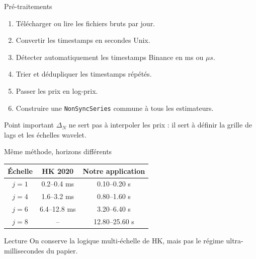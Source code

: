 \documentclass[10pt,aspectratio=169]{beamer}
\begin{document}
\begin{frame}{Pré-traitements}
  \begin{enumerate}
    \item Télécharger ou lire les fichiers bruts par jour.
    \item Convertir les timestamps en secondes Unix.
    \item Détecter automatiquement les timestamps Binance en ms ou \(\mu s\).
    \item Trier et dédupliquer les timestamps répétés.
    \item Passer les prix en log-prix.
    \item Construire une \texttt{NonSyncSeries} commune à tous les estimateurs.
  \end{enumerate}

  \vspace{0.35cm}
  \begin{exampleblock}{Point important}
    \(\Delta_N\) ne sert pas à interpoler les prix : il sert à définir la grille de lags et les échelles wavelet.
  \end{exampleblock}
\end{frame}

\begin{frame}{Même méthode, horizons différents}
  \small
  \begin{center}
  \begin{tabular}{ccc}
    \toprule
    \textbf{Échelle} & \textbf{HK 2020} & \textbf{Notre application} \\
    \midrule
    \(j=1\) & 0.2--0.4 ms & 0.10--0.20 s \\
    \(j=4\) & 1.6--3.2 ms & 0.80--1.60 s \\
    \(j=6\) & 6.4--12.8 ms & 3.20--6.40 s \\
    \(j=8\) & -- & 12.80--25.60 s \\
    \bottomrule
  \end{tabular}
  \end{center}

  \vspace{0.35cm}
  \begin{exampleblock}{Lecture}
    On conserve la logique multi-échelle de HK, mais pas le régime ultra-millisecondes du papier.
  \end{exampleblock}
\end{frame}
\end{document}
